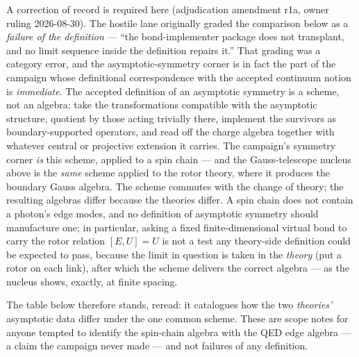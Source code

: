 A correction of record is required here (adjudication amendment r1a, owner
ruling 2026-08-30). The hostile lane originally graded the comparison below
as a \emph{failure of the definition} --- ``the bond-implementer package does
not transplant, and no limit sequence inside the definition repairs it.''
That grading was a category error, and the asymptotic-symmetry corner is in
fact the part of the campaign whose definitional correspondence with the
accepted continuum notion is \emph{immediate}. The accepted definition of an
asymptotic symmetry is a scheme, not an algebra: take the transformations
compatible with the asymptotic structure, quotient by those acting trivially
there, implement the survivors as boundary-supported operators, and read off
the charge algebra together with whatever central or projective extension it
carries. The campaign's symmetry corner \emph{is} this scheme, applied to a
spin chain --- and the Gauss-telescope nucleus above is the \emph{same}
scheme applied to the rotor theory, where it produces the boundary Gauss
algebra. The scheme commutes with the change of theory; the resulting
algebras differ because the theories differ. A spin chain does not contain a
photon's edge modes, and no definition of asymptotic symmetry should
manufacture one; in particular, asking a fixed finite-dimensional virtual
bond to carry the rotor relation $[E,U]=U$ is not a test any theory-side
definition could be expected to pass, because the limit in question is taken
in the \emph{theory} (put a rotor on each link), after which the scheme
delivers the correct algebra --- as the nucleus shows, exactly, at finite
spacing.

The table below therefore stands, reread: it catalogues how the two
\emph{theories'} asymptotic data differ under the one common scheme. These
are scope notes for anyone tempted to identify the spin-chain algebra with
the QED edge algebra --- a claim the campaign never made --- and not
failures of any definition.


